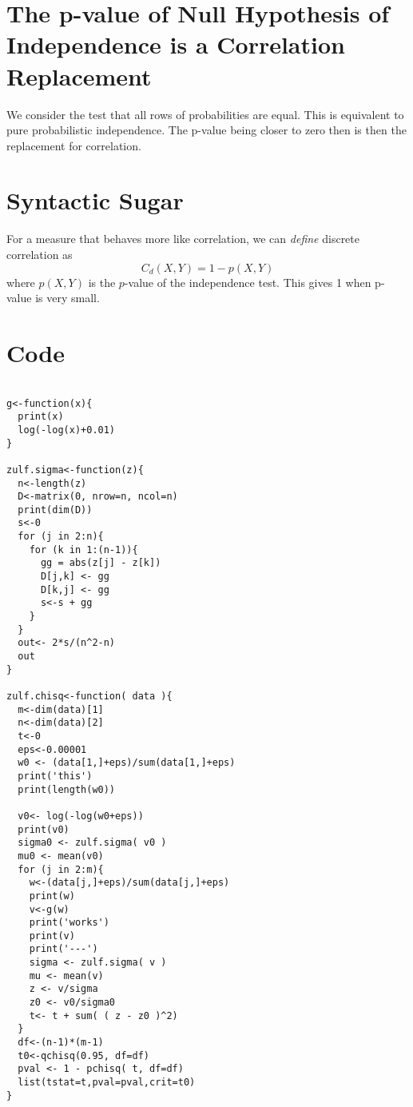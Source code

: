 \documentclass{amsart}
\begin{document}
\section{The p-value of Null Hypothesis of Independence is a Correlation Replacement}

We consider the test that all rows of probabilities are equal.  This is equivalent to pure probabilistic independence.  The p-value being closer to zero then is then the replacement for correlation.

\section{Syntactic Sugar}

For a measure that behaves more like correlation, we can {\em define} discrete correlation as
\[
C_d(X, Y) = 1-p(X,Y)
\]
where $p(X,Y)$ is the $p$-value of the independence test. This gives 1 when p-value is very small.

\section{Code}

\begin{verbatim}

g<-function(x){
  print(x)
  log(-log(x)+0.01)
}

zulf.sigma<-function(z){
  n<-length(z)
  D<-matrix(0, nrow=n, ncol=n)
  print(dim(D))
  s<-0
  for (j in 2:n){
    for (k in 1:(n-1)){
      gg = abs(z[j] - z[k])
      D[j,k] <- gg
      D[k,j] <- gg
      s<-s + gg
    }
  }
  out<- 2*s/(n^2-n)
  out
}

zulf.chisq<-function( data ){
  m<-dim(data)[1]
  n<-dim(data)[2]
  t<-0
  eps<-0.00001
  w0 <- (data[1,]+eps)/sum(data[1,]+eps)
  print('this')
  print(length(w0))
  
  v0<- log(-log(w0+eps))
  print(v0)
  sigma0 <- zulf.sigma( v0 )
  mu0 <- mean(v0)
  for (j in 2:m){
    w<-(data[j,]+eps)/sum(data[j,]+eps)
    print(w)
    v<-g(w)
    print('works')
    print(v)
    print('---')
    sigma <- zulf.sigma( v )
    mu <- mean(v)
    z <- v/sigma
    z0 <- v0/sigma0
    t<- t + sum( ( z - z0 )^2)
  }
  df<-(n-1)*(m-1)
  t0<-qchisq(0.95, df=df)
  pval <- 1 - pchisq( t, df=df)
  list(tstat=t,pval=pval,crit=t0)
}

\end{verbatim}
\end{document}
